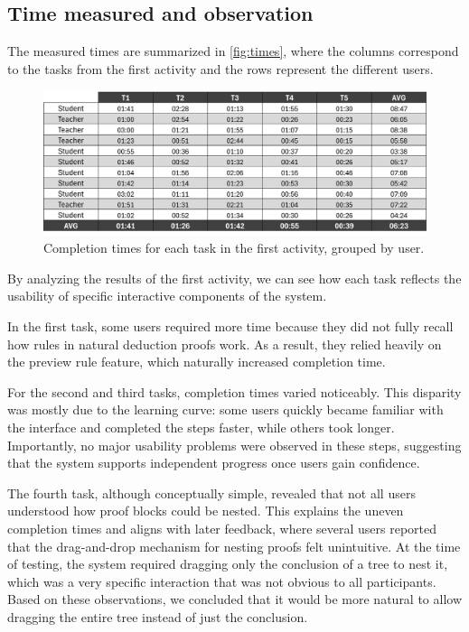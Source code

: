 \subsection{Time measured and observation}
The measured times are summarized in \autoref{fig:times}, where the columns correspond to the tasks from the first activity and the rows represent the different users.  

\begin{figure}[h]
    \centering
    \includegraphics[width=0.95\linewidth]{Chapters/Figures/times.jpg}
    \caption{Completion times for each task in the first activity, grouped by user.}
    \label{fig:times}
\end{figure}

By analyzing the results of the first activity, we can see how each task reflects the usability of specific interactive components of the system.  

In the first task, some users required more time because they did not fully recall how rules in natural deduction proofs work. As a result, they relied heavily on the preview rule feature, which naturally increased completion time.

For the second and third tasks, completion times varied noticeably. This disparity was mostly due to the learning curve: some users quickly became familiar with the interface and completed the steps faster, while others took longer. Importantly, no major usability problems were observed in these steps, suggesting that the system supports independent progress once users gain confidence.  

The fourth task, although conceptually simple, revealed that not all users understood how proof blocks could be nested. This explains the uneven completion times and aligns with later feedback, where several users reported that the drag-and-drop mechanism for nesting proofs felt unintuitive. At the time of testing, the system required dragging only the conclusion of a tree to nest it, which was a very specific interaction that was not obvious to all participants. Based on these observations, we concluded that it would be more natural to allow dragging the entire tree instead of just the conclusion.  

